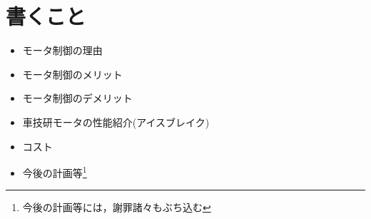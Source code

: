 \documentclass{jlreq}
\begin{document}
    \section{書くこと}
    \begin{itemize}
        \item{モータ制御の理由}
        \item{モータ制御のメリット}
        \item{モータ制御のデメリット}
        \item{車技研モータの性能紹介(アイスブレイク)}
        \item{コスト}
        \item{今後の計画等}\footnote[1]{今後の計画等には，謝罪諸々もぶち込む }
    \end{itemize}
\end{document}

